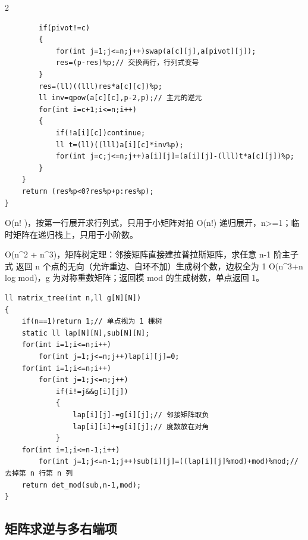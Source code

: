 \documentclass[UTF8,fontset=fandol,a4paper,twoside]{ctexart}
\newcommand{\note}[1]{{\fontsize{10}{12}\selectfont #1\par}}
\begin{document}
\begin{multicols}{2}
\begin{lstlisting}
        if(pivot!=c)
        {
            for(int j=1;j<=n;j++)swap(a[c][j],a[pivot][j]);
            res=(p-res)%p;// 交换两行，行列式变号
        }
        res=(ll)((lll)res*a[c][c])%p;
        ll inv=qpow(a[c][c],p-2,p);// 主元的逆元
        for(int i=c+1;i<=n;i++)
        {
            if(!a[i][c])continue;
            ll t=(ll)((lll)a[i][c]*inv%p);
            for(int j=c;j<=n;j++)a[i][j]=(a[i][j]-(lll)t*a[c][j])%p;
        }
    }
    return (res%p<0?res%p+p:res%p);
}
\end{lstlisting}
\note{O(\allowbreak{}n! )\allowbreak{}，按第一行展开求行列式，只用于小矩阵对拍 O(\allowbreak{}n!)\allowbreak{} 递归展开，n>\allowbreak{}=\allowbreak{}1；临时矩阵在递归栈上，只用于小阶数。}
\note{O(\allowbreak{}n\textasciicircum{}2 +\allowbreak{} n\textasciicircum{}3)\allowbreak{}，矩阵树定理：邻接矩阵直接建拉普拉斯矩阵，求任意 n-\allowbreak{}1 阶主子式 返回 n 个点的无向（允许重边、自环不加）生成树个数，边权全为 1 O(\allowbreak{}n\textasciicircum{}3+\allowbreak{}n log mod)\allowbreak{}，g 为对称重数矩阵；返回模 mod 的生成树数，单点返回 1。}
\begin{lstlisting}
ll matrix_tree(int n,ll g[N][N])
{
    if(n==1)return 1;// 单点视为 1 棵树
    static ll lap[N][N],sub[N][N];
    for(int i=1;i<=n;i++)
        for(int j=1;j<=n;j++)lap[i][j]=0;
    for(int i=1;i<=n;i++)
        for(int j=1;j<=n;j++)
            if(i!=j&&g[i][j])
            {
                lap[i][j]-=g[i][j];// 邻接矩阵取负
                lap[i][i]+=g[i][j];// 度数放在对角
            }
    for(int i=1;i<=n-1;i++)
        for(int j=1;j<=n-1;j++)sub[i][j]=((lap[i][j]%mod)+mod)%mod;// 去掉第 n 行第 n 列
    return det_mod(sub,n-1,mod);
}
\end{lstlisting}
\subsection{矩阵求逆与多右端项}


\end{multicols}
\end{document}
